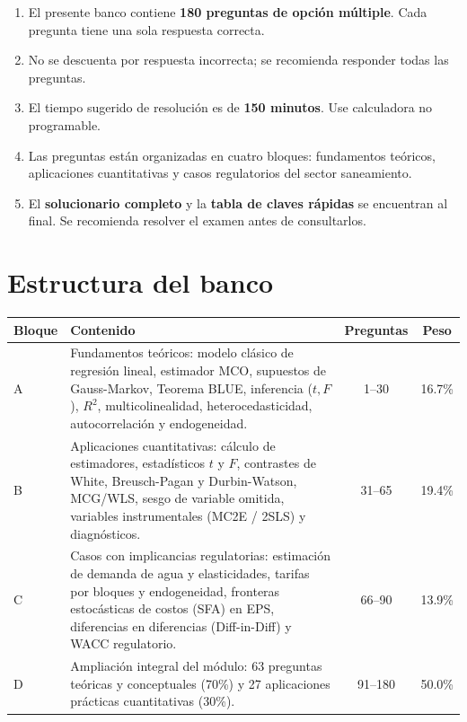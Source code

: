 \documentclass[11pt,a4paper]{article}
\begin{document}
\begin{enumerate}[label=\arabic*.,leftmargin=1.6em,itemsep=3pt]
  \item El presente banco contiene \textbf{180 preguntas de opción múltiple}. Cada pregunta tiene una sola respuesta correcta.
  \item No se descuenta por respuesta incorrecta; se recomienda responder todas las preguntas.
  \item El tiempo sugerido de resolución es de \textbf{150 minutos}. Use calculadora no programable.
  \item Las preguntas están organizadas en cuatro bloques: fundamentos teóricos, aplicaciones cuantitativas y casos regulatorios del sector saneamiento.
  \item El \textbf{solucionario completo} y la \textbf{tabla de claves rápidas} se encuentran al final. Se recomienda resolver el examen antes de consultarlos.
\end{enumerate}

\section*{Estructura del banco}

\begin{center}
\renewcommand{\arraystretch}{1.25}
\begin{tabular}{@{}p{1.4cm}>{\raggedright\arraybackslash}p{7.6cm}cc@{}}
\toprule
\textbf{Bloque} & \textbf{Contenido} & \textbf{Preguntas} & \textbf{Peso} \\
\midrule
A & Fundamentos teóricos: modelo clásico de regresión lineal, estimador MCO, supuestos de Gauss-Markov, Teorema BLUE, inferencia ($t, F$), $R^2$, multicolinealidad, heterocedasticidad, autocorrelación y endogeneidad. & 1--30 & 16.7\% \\
B & Aplicaciones cuantitativas: cálculo de estimadores, estadísticos $t$ y $F$, contrastes de White, Breusch-Pagan y Durbin-Watson, MCG/WLS, sesgo de variable omitida, variables instrumentales (MC2E / 2SLS) y diagnósticos. & 31--65 & 19.4\% \\
C & Casos con implicancias regulatorias: estimación de demanda de agua y elasticidades, tarifas por bloques y endogeneidad, fronteras estocásticas de costos (SFA) en EPS, diferencias en diferencias (Diff-in-Diff) y WACC regulatorio. & 66--90 & 13.9\% \\
D & Ampliación integral del módulo: 63 preguntas teóricas y conceptuales (70\%) y 27 aplicaciones prácticas cuantitativas (30\%). & 91--180 & 50.0\% \\
\bottomrule
\end{tabular}
\end{center}
\end{document}
